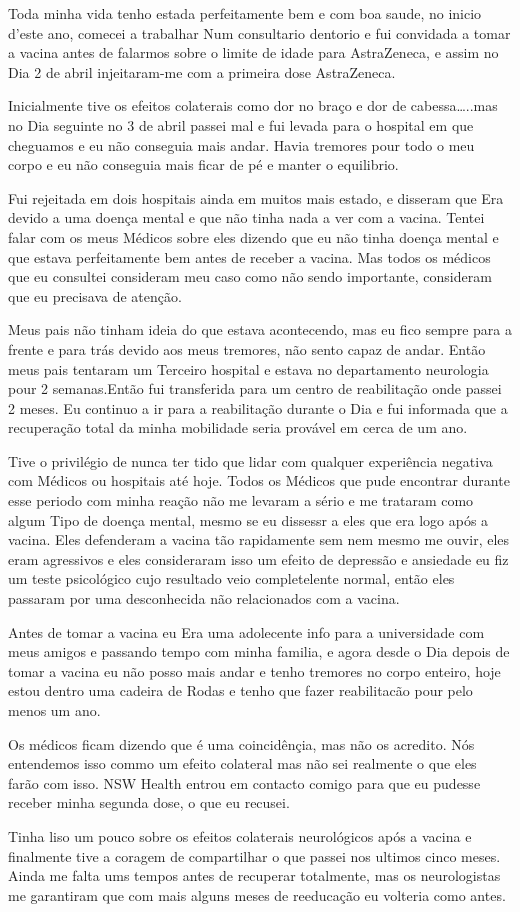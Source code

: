 Toda minha vida tenho estada perfeitamente bem e com boa saude, no inicio d'este
ano, comecei a trabalhar Num consultario dentorio e fui convidada a tomar a
vacina antes de falarmos sobre o limite de idade para AstraZeneca, e assim no
Dia 2 de abril injeitaram-me com a primeira dose AstraZeneca.

Inicialmente tive os efeitos colaterais como dor no braço e dor de cabessa…..mas
no Dia seguinte no 3 de abril passei mal e fui levada para o hospital em que
cheguamos e eu não conseguia mais andar. Havia tremores pour todo o meu corpo e
eu não conseguia mais ficar de pé e manter o equilibrio.

Fui rejeitada em dois hospitais ainda em muitos mais estado, e disseram que Era
devido a uma doença mental e que não tinha nada a ver com a vacina. Tentei falar
com os meus Médicos sobre eles dizendo que eu não tinha doença mental e que
estava perfeitamente bem antes de receber a vacina. Mas todos os médicos que eu
consultei consideram meu caso como não sendo importante, consideram que eu
precisava de atenção.

Meus pais não tinham ideia do que estava acontecendo, mas eu fico sempre para a
frente e para trás devido aos meus tremores, não sento capaz de andar. Então
meus pais tentaram um Terceiro hospital e estava no departamento neurologia pour
2 semanas.Então fui transferida para um centro de reabilitação onde passei 2
meses. Eu continuo a ir para a reabilitação durante o Dia e fui informada que a
recuperação total da minha mobilidade seria provável em cerca de um ano.

Tive o privilégio de nunca ter tido que lidar com qualquer experiência negativa
com Médicos ou hospitais até hoje. Todos os Médicos que pude encontrar durante
esse periodo com minha reação não me levaram a sério e me trataram como algum
Tipo de doença mental, mesmo se eu dissessr a eles que era logo após a
vacina. Eles defenderam a vacina tão rapidamente sem nem mesmo me ouvir, eles
eram agressivos e eles consideraram isso um efeito de depressão e ansiedade eu
fiz um teste psicológico cujo resultado veio completelente normal, então eles
passaram por uma desconhecida não relacionados com a vacina.

Antes de tomar a vacina eu Era uma adolecente info para a universidade com meus
amigos e passando tempo com minha familia, e agora desde o Dia depois de tomar a
vacina eu não posso mais andar e tenho tremores no corpo enteiro, hoje estou
dentro uma cadeira de Rodas e tenho que fazer reabilitacão pour pelo menos um
ano.

Os médicos ficam dizendo que é uma coincidênçia, mas não os acredito. Nós
entendemos isso commo um efeito colateral mas não sei realmente o que eles farão
com isso. NSW Health entrou em contacto comigo para que eu pudesse receber minha
segunda dose, o que eu recusei.

Tinha liso um pouco sobre os efeitos colaterais neurológicos após a vacina e
finalmente tive a coragem de compartilhar o que passei nos ultimos cinco
meses. Ainda me falta ums tempos antes de recuperar totalmente, mas os
neurologistas me garantiram que com mais alguns meses de reeducação eu volteria
como antes.

